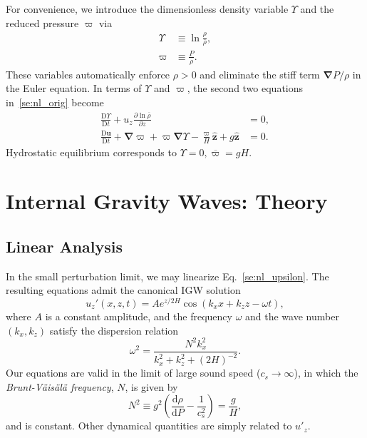 \documentclass[
        fleqn,
        usenatbib,
    ]{mnras}
\newcommand*{\rd}[2]{\frac{\mathrm{d}#1}{\mathrm{d}#2}}
\newcommand*{\pd}[2]{\frac{\partial#1}{\partial#2}}
\newcommand*{\md}[2]{\frac{\mathrm{D}#1}{\mathrm{D}#2}}
\newcommand*{\p}[1]{\left(#1\right)}
\newcommand*{\bm}[1]{\mathbf{#1}}
\newcommand*{\uv}[1]{\hat{\mathbf{#1}}}
\begin{document}
For convenience, we introduce the dimensionless density variable $\Upsilon$ and
the reduced pressure $\varpi$ \citep[e.g.][]{lecoanet_anel} via
\begin{align}
    \Upsilon &\equiv \ln \frac{\rho}{\bar{\rho}},\\
    \varpi &\equiv \frac{P}{\rho}.
\end{align}
These variables automatically enforce $\rho > 0$ and eliminate the stiff term
$\bm{\nabla} P / \rho$ in the Euler equation. In terms of $\Upsilon$ and
$\varpi$, the second two equations in~\eqref{se:nl_orig} become
\begin{subequations}\label{se:nl_upsilon}
    \begin{align}
        \md{\Upsilon}{t} + u_z \pd{\ln \overline{\rho}}{z} &= 0
            ,\label{eq:nl_up_density} \\
        \md{\bm{u}}{t} + \bm{\nabla}\varpi + \varpi\bm{\nabla}\Upsilon
            - \frac{\varpi}{H}\uv{z} + g\uv{z} &= 0\label{eq:nl_upsilon_u}.
    \end{align}
\end{subequations}
Hydrostatic equilibrium corresponds to $\Upsilon = 0, \overline{\varpi} = gH$.

\section{Internal Gravity Waves: Theory}\label{s:theory}

\subsection{Linear Analysis}\label{ss:lin_analysis}

In the small perturbation limit, we may linearize Eq.~\eqref{se:nl_upsilon}.
\textcolor{Corr}{The resulting equations admit the canonical IGW solution}
\citep{drazin,sutherland0}
\begin{equation}
    u_z'\p{x, z, t} = Ae^{z/2H}\cos\p{k_{x}x + k_{z}z - \omega t},
        \label{eq:lin_sol}
\end{equation}
where $A$ is a constant amplitude, and the frequency $\omega$ and the wave
number $\p{k_x, k_z}$ satisfy the dispersion relation
\begin{equation}
    \omega^2 = \frac{N^2k_{x}^2}{k_{x}^2 + k_{z}^2 + \p{2H}^{-2}}.
        \label{eq:disp_rel}
\end{equation}
Our equations are valid in the limit of large sound speed ($c_s \to \infty$), in
which the \emph{Brunt-V\"ais\"al\"a frequency}, $N$, is given by
\begin{equation}
    N^2 \equiv g^2\p{\rd{\rho}{P} - \frac{1}{c_s^2}} = \frac{g}{H},
\end{equation}
and is constant. Other dynamical quantities are simply related to $u'_z$.
\end{document}
